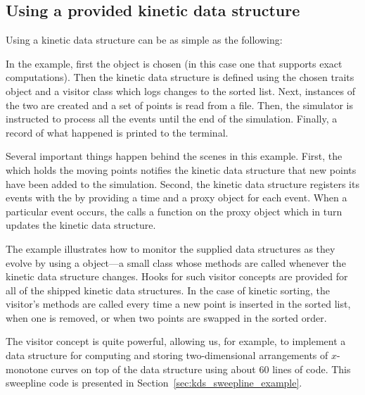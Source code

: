 \subsection{Using a provided kinetic data structure \label{sec:kds_sort_example}}


Using a kinetic data structure can be as simple as the following:
\label{fig:kds_sort_program}

In the example, first the  object is chosen
(in this case one that supports exact computations). Then the kinetic
data structure is defined using the chosen traits object and a
visitor class which logs changes to the sorted list.  Next, instances
of the two are created and a set of points is read from a file. Then,
the simulator is instructed to process all the events until the end of
the simulation.  Finally, a record of what happened is printed to the
terminal.

Several important things happen behind the scenes in this example.
First, the  which holds the moving
points notifies the kinetic data structure that new points have been
added to the simulation. Second, the
 kinetic data structure registers
its events with the  by providing a time and a
proxy object for each event. When a particular event occurs, the
 calls a function on the proxy object which in turn
updates the kinetic data structure.

The example illustrates how to monitor the supplied data structures as
they evolve by using a  object---a small class whose
methods are called whenever the kinetic data structure changes. Hooks
for such visitor concepts are provided for all of the shipped kinetic
data structures. In the case of kinetic sorting, the visitor's
methods are called every time a new point is inserted in the sorted
list, when one is removed, or when two points are swapped in the
sorted order. 


The visitor concept is quite powerful, allowing us, for example, to
implement a data structure for computing and storing two-dimensional
arrangements of $x$-monotone curves on top of the
 data structure using about 60
lines of code. This sweepline code is presented in
Section~\ref{sec:kds_sweepline_example}.



